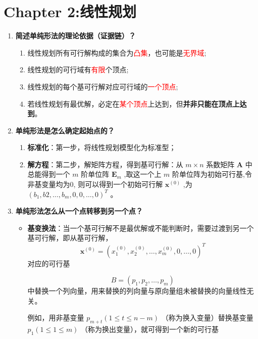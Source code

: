     \section{Chapter 2:线性规划}
	\begin{enumerate}
		\item \textbf{简述单纯形法的理论依据（证据链）？}
		\begin{enumerate}
            \item 线性规划所有可行解构成的集合为\textcolor{red}{凸集}，也可能是\textcolor{red}{无界域};
            \item 线性规划的可行域有\textcolor{red}{有限}个顶点;
            \item 线性规划的每个基可行解对应可行域的\textcolor{red}{一个顶点};
            \item 若线性规划有最优解，必定在\textcolor{red}{某个顶点}上达到，但\textbf{并非只能在顶点上达到}。\\
        \end{enumerate}
		\item \textbf{单纯形法是怎么确定起始点的？}
		\begin{enumerate}
            \item \textbf{标准化}：第一步，将线性规划模型化为标准型；
            \item \textbf{解方程}：第二步，解矩阵方程，得到基可行解：从 \( m \times  n \) 系数矩阵 \( \mathbf{A} \) 中总能得到一个 \( m \) 阶单位阵 \( {\mathbf{E}}_{m} \) ,取这一个上 \( m \) 阶单位阵为初始可行基,令非基变量均为0,
则可以得到一个初始可行解 \( {\mathbf{x}}^{\left( 0\right) } \) ,为 \( {\left( {b}_{1},b2,\ldots ,{b}_{m},0,0,\ldots ,0\right) }^{T} \) 。
        \end{enumerate}
		\item \textbf{单纯形法怎么从一个点转移到另一个点？ }
		\begin{itemize}
            \item \textbf{基变换法}：当一个基可行解不是最优解或不能判断时，需要过渡到另一个基可行解，即从基可行解，
    \[
    \mathbf{x}^{(0)} = \left( x_1^{(0)}, x_2^{(0)}, \ldots, x_m^{(0)}, 0, \ldots, 0 \right)^T
    \]
    对应的可行基 

    \[
    B = \left( p_1, p_2, \ldots, p_m \right)
    \]
    中替换一个列向量，用来替换的列向量与原向量组未被替换的向量线性无关。

    例如，用非基变量 \( p_{m+t} \left( 1 \leq t \leq n - m \right) \) （称为换入变量）替换基变量 \( p_1 \left( 1 \leq 1 \leq m \right) \) （称为换出变量），就可得到一个新的可行基


\end{itemize}
\end{enumerate}

